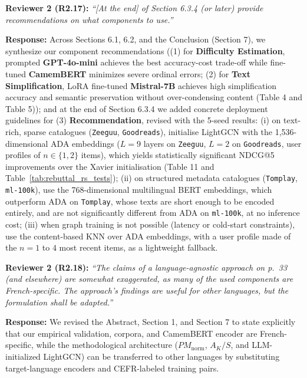 \documentclass[11pt,a4paper]{article}
\newcommand{\mm}[1]{#1}
\begin{document}
\begin{reviewbox}
\textbf{Reviewer 2 (R2.17):} \textit{``[At the end] of Section 6.3.4 (or later) provide recommendations on what components to use.''}
\end{reviewbox}

\noindent\textbf{Response:}
Across Sections 6.1, 6.2, and the Conclusion (Section 7), we synthesize our component recommendations ((1) for \textbf{Difficulty Estimation}, prompted \textbf{GPT-4o-mini} achieves the best accuracy-cost trade-off while fine-tuned \textbf{CamemBERT} minimizes severe ordinal errors; (2) for \textbf{Text Simplification}, LoRA fine-tuned \textbf{Mistral-7B} achieves high simplification accuracy and semantic preservation without over-condensing content (Table 4 and Table 5)); and at the end of Section 6.3.4 we added concrete deployment guidelines for (3) \textbf{Recommendation}, \mm{revised with the 5-seed results: (i) on text-rich, sparse catalogues (\texttt{Zeeguu}, \texttt{Goodreads}), initialise LightGCN with the 1,536-dimensional ADA embeddings ($L = 9$ layers on \texttt{Zeeguu}, $L = 2$ on \texttt{Goodreads}, user profiles of $n \in \{1, 2\}$ items), which yields statistically significant NDCG@5 improvements over the Xavier initialisation (Table 11 and Table~\ref{tab:rebuttal_rs_tests}); (ii) on structured metadata catalogues (\texttt{Tomplay}, \texttt{ml-100k}), use the 768-dimensional multilingual BERT embeddings, which outperform ADA on \texttt{Tomplay}, whose texts are short enough to be encoded entirely, and are not significantly different from ADA on \texttt{ml-100k}, at no inference cost; (iii) when graph training is not possible (latency or cold-start constraints), use the content-based KNN over ADA embeddings, with a user profile made of the $n = 1$ to $4$ most recent items, as a lightweight fallback.}

\begin{reviewbox}
\textbf{Reviewer 2 (R2.18):} \textit{``The claims of a language-agnostic approach on p.\ 33 (and elsewhere) are somewhat exaggerated, as many of the used components are French-specific. The approach's findings are useful for other languages, but the formulation shall be adapted.''}
\end{reviewbox}

\noindent\textbf{Response:}
We revised the Abstract, Section 1, and Section 7 to state explicitly that our empirical validation, corpora, and CamemBERT encoder are French-specific, while the methodological architecture ($PM_{\text{norm}}$, $A_K/S$, and LLM-initialized LightGCN) can be transferred to other languages by substituting target-language encoders and CEFR-labeled training pairs.
\end{document}

